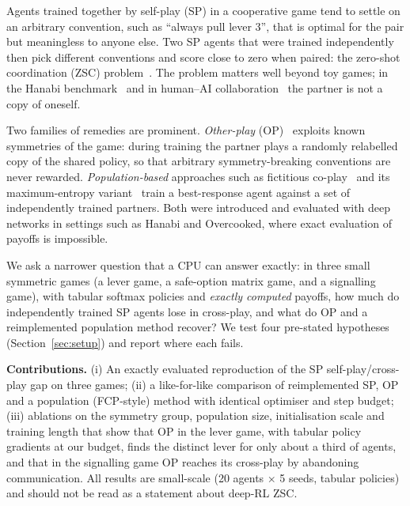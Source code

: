 Agents trained together by self-play (SP) in a cooperative game tend to settle on an arbitrary convention, such as ``always pull lever 3'', that is optimal for the pair but meaningless to anyone else. Two SP agents that were trained independently then pick different conventions and score close to zero when paired: the zero-shot coordination (ZSC) problem~\cite{hu2020other}. The problem matters well beyond toy games; in the Hanabi benchmark~\cite{bard2019hanabi} and in human--AI collaboration~\cite{carroll2019utility,strouse2021collaborating} the partner is not a copy of oneself.

Two families of remedies are prominent. \emph{Other-play} (OP)~\cite{hu2020other} exploits known symmetries of the game: during training the partner plays a randomly relabelled copy of the shared policy, so that arbitrary symmetry-breaking conventions are never rewarded. \emph{Population-based} approaches such as fictitious co-play~\cite{strouse2021collaborating} and its maximum-entropy variant~\cite{zhao2021maximum} train a best-response agent against a set of independently trained partners. Both were introduced and evaluated with deep networks in settings such as Hanabi and Overcooked, where exact evaluation of payoffs is impossible.

We ask a narrower question that a CPU can answer exactly: in three small symmetric games (a lever game, a safe-option matrix game, and a signalling game), with tabular softmax policies and \emph{exactly computed} payoffs, how much do independently trained SP agents lose in cross-play, and what do OP and a reimplemented population method recover? We test four pre-stated hypotheses (Section~\ref{sec:setup}) and report where each fails.

\textbf{Contributions.} (i) An exactly evaluated reproduction of the SP self-play/cross-play gap on three games; (ii) a like-for-like comparison of reimplemented SP, OP and a population (FCP-style) method with identical optimiser and step budget; (iii) ablations on the symmetry group, population size, initialisation scale and training length that show that OP in the lever game, with tabular policy gradients at our budget, finds the distinct lever for only about a third of agents, and that in the signalling game OP reaches its cross-play by abandoning communication. All results are small-scale (20 agents $\times$ 5 seeds, tabular policies) and should not be read as a statement about deep-RL ZSC.
